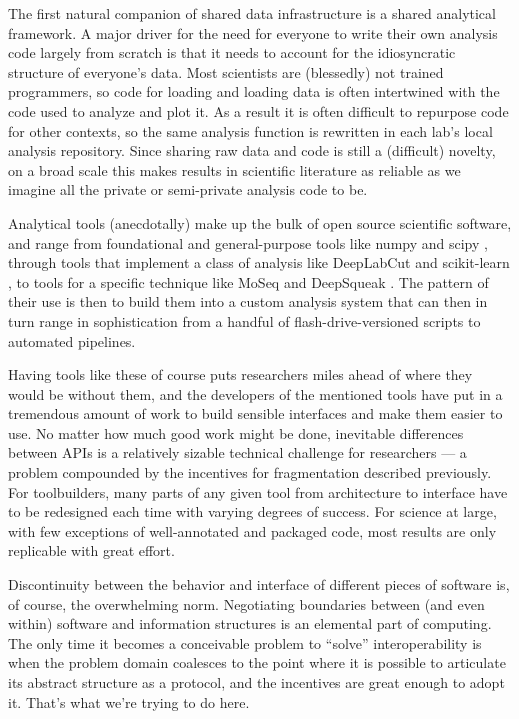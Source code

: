 The first natural companion of shared data infrastructure is a shared
analytical framework. A major driver for the need for everyone to write
their own analysis code largely from scratch is that it needs to account
for the idiosyncratic structure of everyone's data. Most scientists are
(blessedly) not trained programmers, so code for loading and loading
data is often intertwined with the code used to analyze and plot it. As
a result it is often difficult to repurpose code for other contexts, so
the same analysis function is rewritten in each lab's local analysis
repository. Since sharing raw data and code is still a (difficult)
novelty, on a broad scale this makes results in scientific literature as
reliable as we imagine all the private or semi-private analysis code to
be.

Analytical tools (anecdotally) make up the bulk of open source
scientific software, and range from foundational and general-purpose
tools like numpy \citep{harrisArrayProgrammingNumPy2020}  and
scipy \citep{virtanenSciPyFundamentalAlgorithms2020} , through
tools that implement a class of analysis like DeepLabCut \citep{mathisDeepLabCutMarkerlessPose2018}  and scikit-learn \citep{pedregosaScikitlearnMachineLearning2011} , to tools for a specific
technique like MoSeq \citep{wiltschkoRevealingStructurePharmacobehavioral2020}  and DeepSqueak
\citep{coffeyDeepSqueakDeepLearningbased2019} . The pattern of
their use is then to build them into a custom analysis system that can
then in turn range in sophistication from a handful of
flash-drive-versioned scripts to automated pipelines.

Having tools like these of course puts researchers miles ahead of where
they would be without them, and the developers of the mentioned tools
have put in a tremendous amount of work to build sensible interfaces and
make them easier to use. No matter how much good work might be done,
inevitable differences between APIs is a relatively sizable technical
challenge for researchers --- a problem compounded by the incentives for
fragmentation described previously. For toolbuilders, many parts of any
given tool from architecture to interface have to be redesigned each
time with varying degrees of success. For science at large, with few
exceptions of well-annotated and packaged code, most results are only
replicable with great effort.

Discontinuity between the behavior and interface of different pieces of
software is, of course, the overwhelming norm. Negotiating boundaries
between (and even within) software and information structures is an
elemental part of computing. The only time it becomes a conceivable
problem to ``solve'' interoperability is when the problem domain
coalesces to the point where it is possible to articulate its abstract
structure as a protocol, and the incentives are great enough to adopt
it. That's what we're trying to do here.

